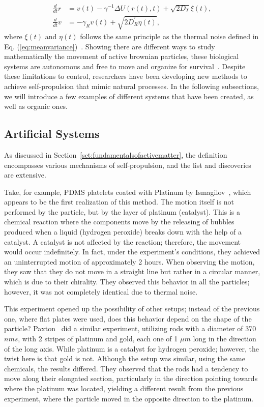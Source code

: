 \begin{align}
  \frac{d}{dt}r &= v(t) - \gamma^{-1} \Delta U(r(t), t) + \sqrt{2D_T} \xi (t),\\
  \frac{d}{dt}v &= -\gamma _R v(t) + \sqrt{2D^{'}_R \eta (t)},
\end{align}
where $\xi (t)$ and $\eta (t)$ follows the same principle as the thermal noise defined in Eq. (\ref{eq:meanvariance})~\cite{semeraro2021work}. Showing there are different ways to study mathematically the movement of active brownian particles, these biological systems are autonomous and free to move and organize for survival~\cite{munoz2016myxobacteria}. Despite these limitations to control, researchers have been developing new methods to achieve self-propulsion that mimic natural processes. In the following subsections, we will introduce a few examples of different systems that have been created, as well as organic ones.


\subsection{Artificial Systems}

As discussed in Section~\ref{sct:fundamentalsofactivematter}, the definition encompasses various mechanisms of self-propulsion, and the list and discoveries are extensive.

Take, for example, PDMS platelets coated with Platinum by Ismagilov~\cite{ismagilov2002autonomous}, which appears to be the first realization of this method. The motion itself is not performed by the particle, but by the layer of platinum (catalyst). This is a chemical reaction where the components move by the releasing of bubbles produced when a liquid (hydrogen peroxide) breaks down with the help of a catalyst. A catalyst is not affected by the reaction; therefore, the movement would occur indefinitely. In fact, under the experiment's conditions, they achieved an uninterrupted motion of approximately 2 hours. 
When observing the motion, they saw that they do not move in a straight line but rather in a circular manner, which is due to their chirality. They observed this behavior in all the particles; however, it was not completely identical due to thermal noise.  


This experiment opened up the possibility of other setups; instead of the previous one, where flat plates were used, does this behavior depend on the shape of the particle? Paxton~\cite{paxton2004catalytic} did a similar experiment, utilizing rods with a diameter of  370 $nms$, with 2 stripes of platinum and gold, each one of 1 $\mu m$ long in the direction of the long axis. While platinum is a catalyst for hydrogen peroxide; however, the twist here is that gold is not. Although the setup was similar, using the same chemicals, the results differed. They observed that the rods had a tendency to move along their elongated section, particularly in the direction pointing towards where the platinum was located, yielding a different result from the previous experiment, where the particle moved in the opposite direction to the platinum.

